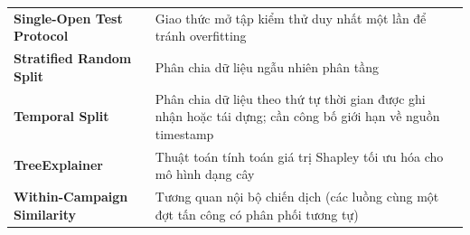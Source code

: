 \begin{longtable}{p{5.5cm}p{9.0cm}}
\textbf{Single-Open Test Protocol} & Giao thức mở tập kiểm thử duy nhất một lần để tránh overfitting \\
\textbf{Stratified Random Split} & Phân chia dữ liệu ngẫu nhiên phân tầng \\
\textbf{Temporal Split} & Phân chia dữ liệu theo thứ tự thời gian được ghi nhận hoặc tái dựng; cần công bố giới hạn về nguồn timestamp \\
\textbf{TreeExplainer} & Thuật toán tính toán giá trị Shapley tối ưu hóa cho mô hình dạng cây \\
\textbf{Within-Campaign Similarity} & Tương quan nội bộ chiến dịch (các luồng cùng một đợt tấn công có phân phối tương tự) \\
\end{longtable}
